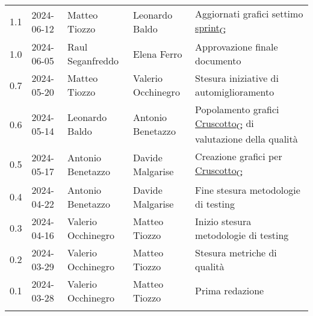 \documentclass[italian,12pt]{article} %
\begin{document}
\begin{table}[!h]
\begin{center}
\begin{tabular}{ l l l l p{6cm} }
			1.1  & 2024-06-12 & Matteo Tiozzo      & Leonardo Baldo     & Aggiornati grafici settimo \href{https://7last.github.io/docs/pb/documentazione-interna/glossario\#sprint}{sprint\textsubscript{G}} \\
			1.0  & 2024-06-05 & Raul Seganfreddo   & Elena Ferro        & Approvazione finale documento                              \\
			0.7  & 2024-05-20 & Matteo Tiozzo      & Valerio Occhinegro & Stesura iniziative di automiglioramento                    \\
			0.6  & 2024-05-14 & Leonardo Baldo     & Antonio Benetazzo  & Popolamento grafici \href{https://7last.github.io/docs/pb/documentazione-interna/glossario\#cruscotto}{Cruscotto\textsubscript{G}} di valutazione della qualità \\
			0.5  & 2024-05-17 & Antonio Benetazzo  & Davide Malgarise   & Creazione grafici per \href{https://7last.github.io/docs/pb/documentazione-interna/glossario\#cruscotto}{Cruscotto\textsubscript{G}}                            \\
			0.4  & 2024-04-22 & Antonio Benetazzo  & Davide Malgarise   & Fine stesura metodologie di testing                        \\
			0.3  & 2024-04-16 & Valerio Occhinegro & Matteo Tiozzo      & Inizio stesura metodologie di testing                      \\
			0.2  & 2024-03-29 & Valerio Occhinegro & Matteo Tiozzo      & Stesura metriche di qualità                                \\
			0.1  & 2024-03-28 & Valerio Occhinegro & Matteo Tiozzo      & Prima redazione                                            \\
			\\[-1.5ex] \hline
		\end{tabular}
	\end{center}
\end{table}
\captionsetup[table]{list=yes}
\newpage
\tableofcontents
\listoftables
\listoffigures
\newpage





\end{document}
